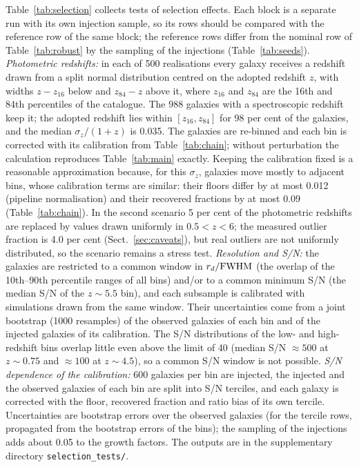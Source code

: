 \documentclass[fleqn,usenatbib]{mnras}
\begin{document}
Table~\ref{tab:selection} collects tests of selection effects. Each block is a
separate run with its own injection sample, so its rows should be compared with
the reference row of the same block; the reference rows differ from the nominal
row of Table~\ref{tab:robust} by the sampling of the injections
(Table~\ref{tab:seeds}). \textit{Photometric redshifts:} in each of 500
realisations every galaxy receives a redshift drawn from a split normal
distribution centred on the adopted redshift $z$, with widths $z-z_{16}$ below and
$z_{84}-z$ above it, where $z_{16}$ and $z_{84}$ are the 16th and 84th
percentiles of the catalogue. The 988 galaxies with a spectroscopic redshift keep
it; the adopted redshift lies within $[z_{16},z_{84}]$ for 98 per cent of the
galaxies, and the median $\sigma_z/(1+z)$ is 0.035. The galaxies are re-binned and
each bin is corrected with its calibration from Table~\ref{tab:chain}; without
perturbation the calculation reproduces Table~\ref{tab:main} exactly. Keeping the
calibration fixed is a reasonable approximation because, for this $\sigma_z$,
galaxies move mostly to adjacent bins, whose calibration terms are similar: their
floors differ by at most 0.012 (pipeline normalisation) and their recovered
fractions by at most 0.09 (Table~\ref{tab:chain}). In the second scenario
5 per cent of the photometric redshifts are replaced by values drawn uniformly in
$0.5<z<6$; the measured outlier fraction is 4.0 per cent
(Sect.~\ref{sec:caveats}), but real outliers are not uniformly distributed, so
the scenario remains a stress test. \textit{Resolution and S/N:} the galaxies are restricted to a
common window in $r_d/{\rm FWHM}$ (the overlap of the 10th--90th percentile
ranges of all bins) and/or to a common minimum S/N (the median S/N of the
$z\sim5.5$ bin), and each subsample is calibrated with simulations drawn from
the same window. Their uncertainties come from a joint bootstrap
(1000 resamples) of the observed galaxies of each bin and of the injected
galaxies of its calibration. The S/N distributions of the low- and high-redshift bins
overlap little even above the limit of 40 (median S/N $\approx500$ at $z\sim0.75$
and $\approx100$ at $z\sim4.5$), so a common S/N window is not possible. \textit{S/N dependence of
the calibration:} 600 galaxies per bin are injected, the injected and the
observed galaxies of each bin are split into S/N terciles, and each galaxy is
corrected with the floor, recovered fraction and ratio bias of its own tercile.
Uncertainties are bootstrap errors over the observed galaxies (for the tercile
rows, propagated from the bootstrap errors of the bins); the sampling of
the injections adds about 0.05 to the growth factors. The outputs are in the
supplementary directory \texttt{selection\_tests/}.








\bsp	%
\label{lastpage}
\end{document}
